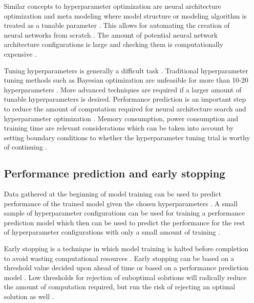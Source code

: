 Similar concepts to hyperparameter optimization are neural architecture optimization and meta modeling where model structure or modeling algorithm is treated as a tunable parameter \parencite{bakerAcceleratingNeuralArchitecture2017}. This allows for automating the creation of neural networks from scratch \parencite{bakerAcceleratingNeuralArchitecture2017}. The amount of potential neural network architecture configurations is large and checking them is computationally expensive \parencite{bakerAcceleratingNeuralArchitecture2017}.

Tuning hyperparameters is generally a difficult task \parencite{maclaurinGradientbasedHyperparameterOptimization2015}. Traditional hyperparameter tuning methods such as Bayesian optimization are unfeasible for more than 10-20 hyperparameters \parencite{maclaurinGradientbasedHyperparameterOptimization2015}.
More advanced techniques are required if a larger amount of tunable hyperparameters is desired.
Performance prediction is an important step to reduce the amount of computation required for neural architecture search and hyperparameter optimization \parencite{bakerAcceleratingNeuralArchitecture2017}.
Memory consumption, power consumption and training time are relevant considerations which can be taken into account by setting boundary conditions to whether the hyperparameter tuning trial is worthy of continuing \parencite{yuHyperParameterOptimizationReview2020}.


\subsection{Performance prediction and early stopping}

Data gathered at the beginning of model training can be used to predict performance of the trained model given the chosen hyperparameters \parencite{bakerAcceleratingNeuralArchitecture2017}. A small sample of hyperparameter configurations can be used for training a performance prediction model which then can be used to predict the performance for the rest of hyperparameter configurations with only a small amount of training \parencite{bakerAcceleratingNeuralArchitecture2017}.

Early stopping is a technique in which model training is halted before completion to avoid wasting computational resources \parencite{precheltAutomaticEarlyStopping1998}. Early stopping can be based on a threshold value decided upon ahead of time or based on a performance prediction model \parencite{bakerAcceleratingNeuralArchitecture2017}. Low thresholds for rejection of suboptimal solutions will radically reduce the amount of computation required, but run the risk of rejecting an optimal solution as well \parencite{bakerAcceleratingNeuralArchitecture2017}.

